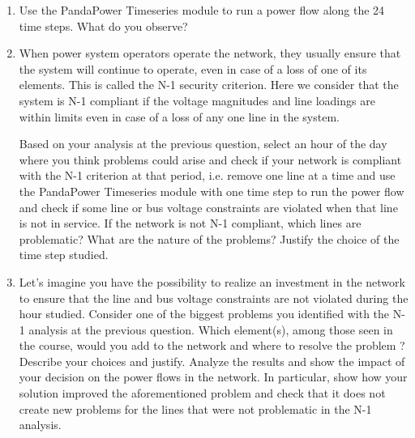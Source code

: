 \documentclass[11pt,a4paper]{article}
\begin{document}
\begin{enumerate}
    \item Use the PandaPower Timeseries module to run a power flow along the 24 time steps. What do you observe?
    
    \item When power system operators operate the network, they usually ensure that the system will continue to operate, even in case of a loss of one of its elements. This is called the N-1 security criterion. Here we consider that the system is N-1 compliant if the voltage magnitudes and line loadings are within limits even in case of a loss of any one line in the system. 
    
    Based on your analysis at the previous question, select an hour of the day where you think problems could arise and check if your network is compliant with the N-1 criterion at that period, i.e. remove one line at a time and use the PandaPower Timeseries module with one time step to run the power flow and check if some line or bus voltage constraints are violated when that line is not in service. If the network is not N-1 compliant, which lines are problematic? What are the nature of the problems? Justify the choice of the time step studied.
    
    \item Let's imagine you have the possibility to realize an investment in the network to ensure that the line and bus voltage constraints are not violated during the hour studied. Consider one of the biggest problems you identified with the N-1 analysis at the previous question. Which element(s), among those seen in the course, would you add to the network and where to resolve the problem ? Describe your choices and justify. Analyze the results and show the impact of your decision on the power flows in the network. In particular, show how your solution improved the aforementioned problem and check that it does not create new problems for the lines that were not problematic in the N-1 analysis.
\end{enumerate}





\end{document}
